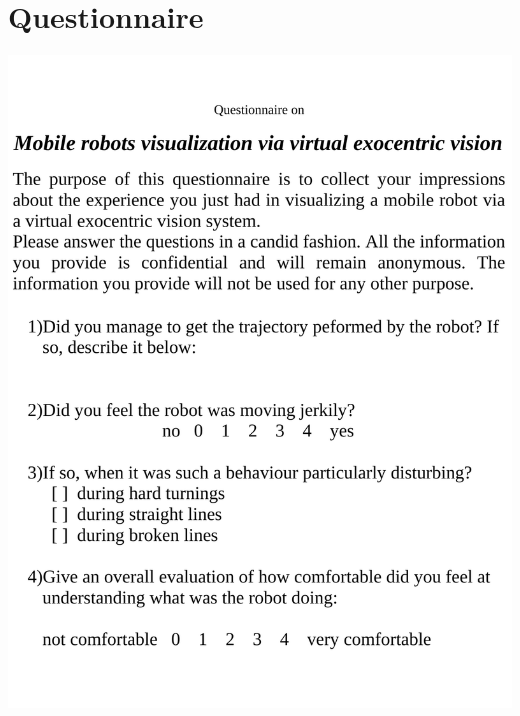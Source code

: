 \setcounter{figure}{0}
\setcounter{table}{0}
\setcounter{lstlisting}{0}

\chapter{Questionnaire}
\label{questionnaire}
\includegraphics[scale=0.6]{questionnaire.pdf}
